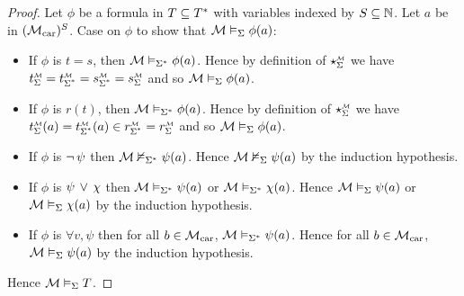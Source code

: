 \begin{proof}
    Let $\phi$ be a formula in $T \subseteq T^*$ with variables
    indexed by $S \subseteq \mathbb{N}$.
    Let $a$ be in $(\mathcal{M}_\mathrm{car})^S$.
    Case on $\phi$ to show that 
    $\mathcal{M} \vDash_{\Sigma} \phi(a)$:
    \begin{itemize}
        \item If $\phi$ is $t = s$, 
        then $\mathcal{M} \vDash_{\Sigma^*} \phi(a)$.
        Hence by definition of $\intp{\Si}{\MM}$ we have
        $\subintp{\Si}{\MM}{t} = \subintp{\Si^*}{\MM}{t} =
        \subintp{\Si^*}{\MM}{s} = \subintp{\Si}{\MM}{s}$ 
        and so
        $\mathcal{M} \vDash_{\Sigma} \phi(a)$.
        \item If $\phi$ is $r(t)$, 
        then $\mathcal{M} \vDash_{\Sigma^*} \phi(a)$.
        Hence by definition of $\intp{\Si}{\MM}$ we have
        $\subintp{\Si}{\MM}{t}(a)  = \subintp{\Si^*}{\MM}{t}(a) \in
        \subintp{\Si^*}{\MM}{r} =  \subintp{\Si}{\MM}{r}$ 
        and so
        $\mathcal{M} \vDash_{\Sigma} \phi(a)$.
        \item If $\phi$ is $\neg\, \psi$
        then $\mathcal{M} \nvDash_{\Sigma^*} \psi(a)$.
        Hence $\mathcal{M} \nvDash_{\Sigma} \psi(a)$ by the induction hypothesis.
        \item If $\phi$ is $\psi \, \lor \, \chi$
        then $\mathcal{M} \vDash_{\Sigma^*} \psi(a)$ or $\mathcal{M} \vDash_{\Sigma^*} \chi(a)$.
        Hence $\mathcal{M} \vDash_{\Sigma} \psi(a)$ or 
        $\mathcal{M} \vDash_{\Sigma} \chi(a)$
        by the induction hypothesis.
        \item If $\phi$ is $\forall v, \psi$ then for all $b \in \mathcal{M}_\mathrm{car}$, $\mathcal{M} \vDash_{\Sigma^*} \psi(a)$. 
        Hence for all $b \in \mathcal{M}_\mathrm{car}$,
        $\mathcal{M} \vDash_{\Sigma} \psi(a)$ by the induction hypothesis.
    \end{itemize}
    Hence $\mathcal{M} \vDash_{\Sigma} T$.
\end{proof}

